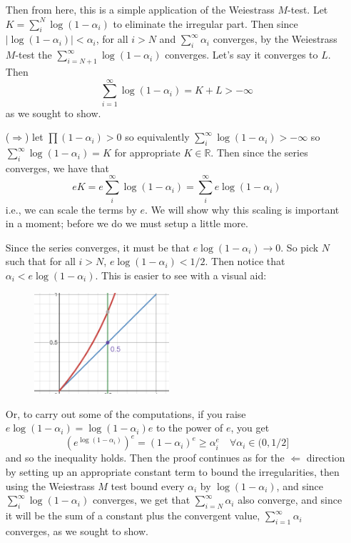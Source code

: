 \documentclass[oneside]{book}
\newcommand{\R}{\mathbb{R}}
\newcommand{\rw}{\rightarrow}
\newcommand{\Rw}{\Rightarrow}
\newcommand{\Lw}{\Leftarrow}
\begin{document}
\begin{Proof}
\begin{enumerate}
				Then from here, this is a simple application of the Weiestrass $M$-test. Let $K = \sum_i^N
				\log(1-\alpha_i)$ to eliminate the irregular part. Then since $|\log(1-\alpha_i)| < \alpha_i$,
				for all $i > N$ and $\sum_i^\infty \alpha_i$ converges, by the Weiestrass $M$-test the $\sum_{i=N+1}^\infty
				\log(1-\alpha_i)$ converges. Let's say it converges to $L$. Then
				\[
					\sum_{i=1}^\infty \log(1-\alpha_i) = K + L > -\infty
				\]
				as we sought to show.
			\item[($\Rw$)] let $\prod (1-\alpha_i) > 0$ so equivalently $\sum_i^\infty \log(1-\alpha_i)
				> -\infty$ so $\sum_i^\infty \log(1-\alpha_i) = K$ for appropriate $K \in \R$. Then since the
				series converges, we have that
				\[
					eK = e\sum_i^\infty \log(1-\alpha_i) = \sum_i^\infty e\log(1-\alpha_i)
				\]
				i.e., we can scale the terms by $e$. We will show why this scaling is important in a moment;
				before we do we must setup a little more. 

				Since the series converges, it must be that $e\log(1-\alpha_i) \rw 0$. So pick $N$ such that
				for all $i > N$, $e\log(1-\alpha_i) < 1/2$. Then notice that $\alpha_i < e\log(1-\alpha_i)$.
				This is easier to see with a visual aid:
				\begin{figure}[H]
					\centering
					\includegraphics[width=5cm]{q32VisualIntuition2}
				\end{figure}

				Or, to carry out some of the computations, if you raise $e\log(1-\alpha_i) = \log(1-\alpha_i)e$ to the
				power of $e$, you get
				\[
					(e^{\log(1-\alpha_i)})^e  = (1-\alpha_i)^e \ge \alpha_i^e \quad \forall \alpha_i \in (0, 1/2]
				\]
				 and so the inequality holds. Then the proof continues as for the $\Lw$ direction by setting up an
				appropriate constant term to bound the irregularities, then using the Weiestrass $M$
				test bound every $\alpha_i$ by $\log(1-\alpha_i)$, and since $\sum_i^\infty
				\log(1-\alpha_i)$ converges, we get that $\sum_{i=N}^\infty \alpha_i$ also converge, and
				since it will be the sum of a constant plus the convergent value, $\sum_{i=1}^\infty
				\alpha_i$ converges, as we sought to show.
		\end{enumerate}


\end{Proof}
\end{document}
